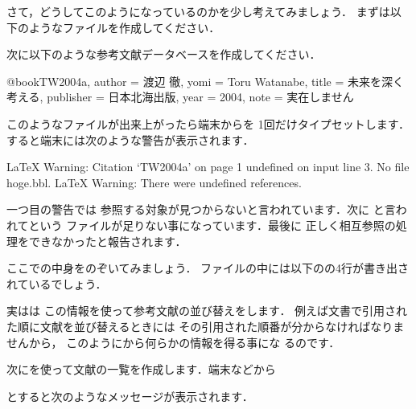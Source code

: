 さて，どうしてこのようになっているのかを少し考えてみましょう．
まずは以下のようなファイルを作成してください．


次に以下のような参考文献データベースを作成してください．

\begin{InText}
@book{TW2004a,
author    = {渡辺 徹},
yomi      = {Toru Watanabe},
title     = {未来を深く考える},
publisher = {日本北海出版},
year      = {2004},
note      = {実在しません}}
\end{InText}

このようなファイルが出来上がったら端末からを
1回だけタイプセットします．すると端末には次のような警告が表示されます．

\begin{OutTerm}
LaTeX Warning: Citation `TW2004a' on page 1 undefined on 
input line 3.
No file hoge.bbl.
LaTeX Warning: There were undefined references.
\end{OutTerm}

一つ目の警告では
参照する対象が見つからないと言われています．次に
と言われてという
ファイルが足りない事になっています．最後に
正しく相互参照の処理をできなかったと報告されます．

%
ここでの中身をのぞいてみましょう．
ファイルの中には以下のの4行が書き出されているでしょう．

\begin{InText}
\relax
{}
\end{InText}

実は{\JBibTeX}は
この情報を使って参考文献の並び替えをします．
例えば文書で引用された順に文献を並び替えるときには
その引用された順番が分からなければなりませんから，
このようにから何らかの情報を得る事にな
るのです．

次に{\JBibTeX}を使って文献の一覧を作成します．端末などから
\begin{InTerm}
\end{InTerm}
とすると次のようなメッセージが表示されます．


